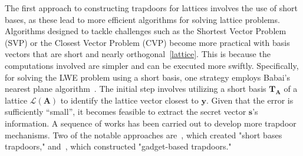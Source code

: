\documentclass[cryptography,review,submit,pdftex,moreauthors,amsmath,amssymb,aps,strict]{Definitions/mdpi}
\begin{document}
The first approach to constructing trapdoors for lattices involves the use of short bases, as these lead to more efficient algorithms for solving lattice problems. Algorithms designed to tackle challenges such as the Shortest Vector Problem (SVP) or the Closest Vector Problem (CVP) become more practical with basis vectors that are short and nearly orthogonal~\ref{lattice}. This is because the computations involved are simpler and can be executed more swiftly. Specifically, for solving the LWE problem using a short basis, one strategy employs Babai's nearest plane algorithm~\cite{Babai}. The initial step involves utilizing a short basis $\mathbf{T}_{\mathbf{A}}$ of a lattice $\mathcal{L}(\mathbf{A})$ to identify the lattice vector closest to $\mathbf{y}$. Given that the error is sufficiently ``small'', it becomes feasible to extract the secret vector $\mathbf{s}$'s information. A sequence of works has been carried out to develop more trapdoor mechanisms. Two of the notable approaches are~\cite{AP09}, which created "short bases trapdoors," and~\cite{MP12}, which constructed "gadget-based trapdoors."
\end{document}
